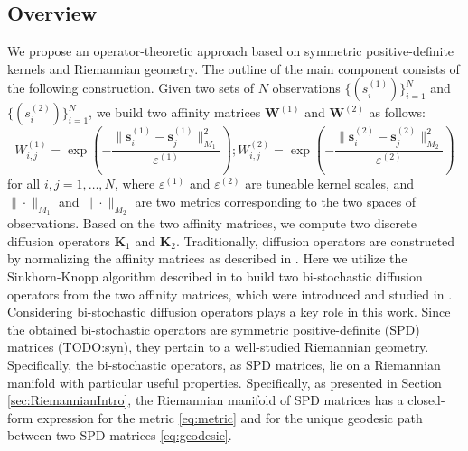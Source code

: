 \documentclass[]{article}
\theoremstyle{definition}
\begin{document}
\subsection{Overview}
We propose an operator-theoretic approach based on symmetric positive-definite kernels and Riemannian geometry.
The outline of the main component consists of the following construction.
%
Given two sets of $N$ observations $\{(s^{(1)}_i)\}_{i=1}^N$ and $\{(s^{(2)}_i)\}_{i=1}^N$, we build two affinity matrices $\mathbf{W}^{(1)}$ and $\mathbf{W}^{(2)}$ as follows:
	\begin{equation}
	W_{i,j}^{(1)}=\exp\left(-\frac{\|\boldsymbol{s}^{(1)}_i-\boldsymbol{s}^{(1)}_j\|_{M_1}^2}{\varepsilon^{(1)}}\right) ; W_{i,j}^{(2)}=\exp\left(-\frac{\|\boldsymbol{s}^{(2)}_i-\boldsymbol{s}^{(2)}_j\|_{M_2}^2}{\varepsilon^{(2)}}\right)
	\end{equation}
	for all $i,j=1,\hdots,N$, where $\varepsilon^{(1)}$ and $\varepsilon^{(2)}$ are tuneable kernel scales, and $\|\cdot\|_{M_1}$ and $\|\cdot\|_{M_2}$ are two metrics corresponding to the two spaces of observations.
Based on the two affinity matrices, we compute two discrete diffusion operators $\mathbf{K}_1$ and $\mathbf{K}_2$.
Traditionally, diffusion operators are constructed by normalizing the affinity matrices as described in \cite{coifman2006diffusion}. Here we utilize the Sinkhorn-Knopp algorithm described in \cite{knight2008sinkhorn} to build two bi-stochastic diffusion operators from the two affinity matrices, which were introduced and studied in \cite{coifman2017manifold}.
%
Considering bi-stochastic diffusion operators plays a key role in this work.
Since the obtained bi-stochastic operators are symmetric positive-definite (SPD) matrices (TODO:syn), they pertain to a well-studied Riemannian geometry. Specifically, the bi-stochastic operators, as SPD matrices, lie on a Riemannian manifold with particular useful properties. Specifically, as presented in Section \ref{sec:RiemannianIntro}, the Riemannian manifold of SPD matrices has a closed-form expression for the metric \eqref{eq:metric} and for the unique geodesic path between two SPD matrices \eqref{eq:geodesic}.
	
\end{document}
